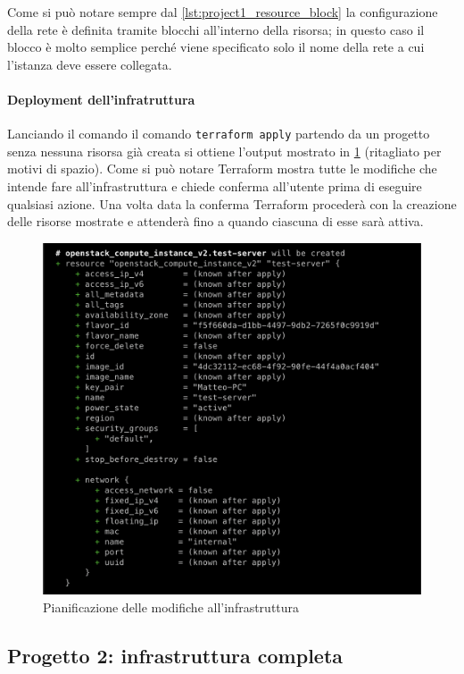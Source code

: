Come si può notare sempre dal \cref{lst:project1_resource_block} la configurazione della rete è definita tramite blocchi all'interno della risorsa; in questo caso il blocco è molto semplice perché viene specificato solo il nome della rete a cui l'istanza deve essere collegata.

\paragraph{Deployment dell'infratruttura}

Lanciando il comando il comando \verb|terraform apply| partendo da un progetto senza nessuna risorsa già creata si ottiene l'output mostrato in \cref{fig:terraform_project1_apply} (ritagliato per motivi di spazio). Come si può notare Terraform mostra tutte le modifiche che intende fare all'infrastruttura e chiede conferma all'utente prima di eseguire qualsiasi azione. Una volta data la conferma Terraform procederà con la creazione delle risorse mostrate e attenderà fino a quando ciascuna di esse sarà attiva.
\begin{figure}[H]
    \center
    \includegraphics[scale=0.35]{tesi/files/immagini/terraform/projects/project1_terraform_apply.png}
    \caption{Pianificazione delle modifiche all'infrastruttura}
    \label{fig:terraform_project1_apply}
\end{figure}

\subsection{Progetto 2: infrastruttura completa}

